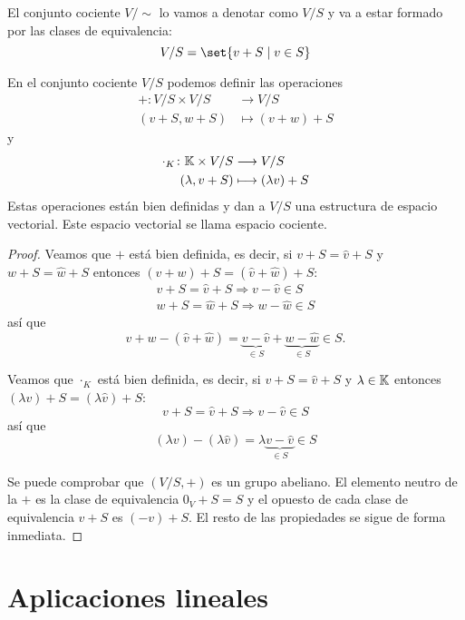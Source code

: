 El conjunto cociente \(V / \sim \) lo vamos a denotar como \(V / S \) y va a estar formado por las clases de equivalencia:
\[
	V / S = \set{v + S \mid v \in S }
\]
\begin{proposition}
	En el conjunto cociente \(V / S \) podemos definir las operaciones
	\[
		\begin{aligned}
			+ \colon V/S \times V / S & \longrightarrow V / S    \\
			(v +S, w + S )            & \longmapsto  (v + w) + S
		\end{aligned}
	\]
	y
	\[
		\begin{aligned}
			\cdot_K \colon \mathbb{K} \times V / S & \longrightarrow V / S        \\
			(\lambda, v + S )              & \longmapsto  (\lambda v) + S
		\end{aligned}
	\]
	Estas operaciones están bien definidas y dan a \(V / S \) una estructura de espacio vectorial. Este espacio vectorial se llama espacio cociente.
\end{proposition}
\begin{proof}
	Veamos que \(+ \) está bien definida, es decir, si \(v + S = \hat{v} + S \) y \(w + S = \hat{w} + S \) entonces \((v + w) + S = (\hat{v} + \hat{w}) + S \):
	\begin{align*}
		v + S = \hat{v} + S \Rightarrow v - \hat{v} \in S \\
		w + S = \hat{w} + S \Rightarrow w - \hat{w} \in S
	\end{align*}
	así que
	\[
		v + w - (\hat{v} + \hat{w}) = \underbrace{v - \hat{v}}_{\in S} + \underbrace{w - \hat{w}}_{\in  S} \in S.
	\]

	Veamos que \(\cdot_K \) está bien definida, es decir, si \(v + S = \hat{v} + S \) y \(\lambda \in \mathbb{K} \) entonces \((\lambda v) + S = (\lambda \hat{v}) + S\):
	\[
		v + S = \hat{v} + S \Rightarrow v - \hat{v} \in S
	\]
	así que
	\[
		(\lambda v) - (\lambda \hat{v}) = \lambda \underbrace{v - \hat{v}}_{\in S} \in S
	\]

	Se puede comprobar que \((V / S, + )\) es un grupo abeliano. El elemento neutro de la \(+ \) es la clase de equivalencia \(0_V + S = S \) y el opuesto de cada clase de equivalencia \(v + S \) es \((-v) + S \). El resto de las propiedades se sigue de forma inmediata.
\end{proof}
\part{Aplicaciones lineales}
